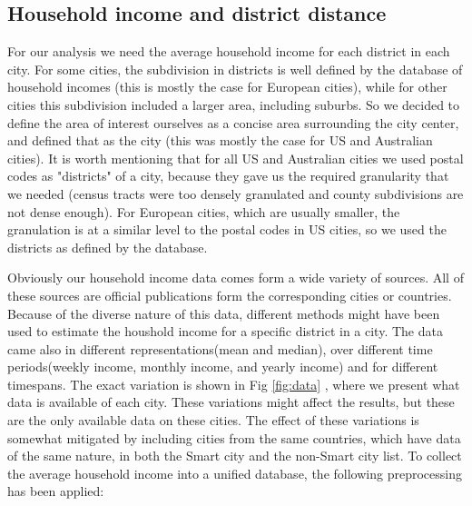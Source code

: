 \documentclass[a4paper, 10pt]{IEEEconf}      %
\begin{document}
\subsection{Household income and district distance}
For our analysis we need the average household income for each district in each city. For some cities, the subdivision in districts is well
defined by the database of household incomes (this is mostly the case for European cities), while for other cities this subdivision included
a larger area, including suburbs. So we decided to define the area of interest ourselves as a concise area surrounding 
the city center, and defined that as the city (this was mostly the case for US and Australian cities). It is worth mentioning that 
for all US and Australian cities we used postal codes as "districts" of a city, because they gave us the required granularity that
we needed (census tracts were too densely granulated and county subdivisions are not dense enough). For European cities, which are usually smaller,
the granulation is at a similar level to the postal codes in US cities, so we used the districts as defined by the database. 

Obviously our household income data comes form a wide variety of sources. All of these sources are official publications form the corresponding 
cities or countries. Because of the diverse nature of this data, different methods might have been used to estimate the houshold income
for a specific district in a city. The data came also in different representations(mean and median), over different time periods(weekly
income, monthly income, and yearly income) and for different timespans. The exact variation is shown in Fig \ref{fig:data} , where we present what data is available of each city.
These variations might affect the results, but these are the only available data on these cities.
The effect of these variations is somewhat mitigated by including cities from the same countries, which have data of the same nature,
in both the Smart city and the non-Smart city list. To collect the average household income into a unified database, the following preprocessing has been applied: 
\end{document}
